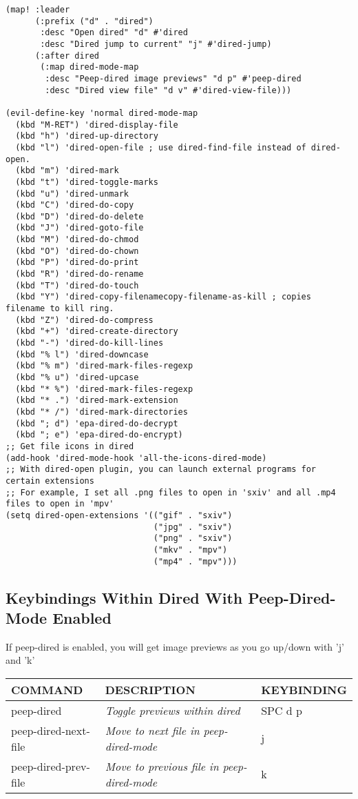 \documentclass[11pt]{article}
\begin{document}
\begin{verbatim}
(map! :leader
      (:prefix ("d" . "dired")
       :desc "Open dired" "d" #'dired
       :desc "Dired jump to current" "j" #'dired-jump)
      (:after dired
       (:map dired-mode-map
        :desc "Peep-dired image previews" "d p" #'peep-dired
        :desc "Dired view file" "d v" #'dired-view-file)))

(evil-define-key 'normal dired-mode-map
  (kbd "M-RET") 'dired-display-file
  (kbd "h") 'dired-up-directory
  (kbd "l") 'dired-open-file ; use dired-find-file instead of dired-open.
  (kbd "m") 'dired-mark
  (kbd "t") 'dired-toggle-marks
  (kbd "u") 'dired-unmark
  (kbd "C") 'dired-do-copy
  (kbd "D") 'dired-do-delete
  (kbd "J") 'dired-goto-file
  (kbd "M") 'dired-do-chmod
  (kbd "O") 'dired-do-chown
  (kbd "P") 'dired-do-print
  (kbd "R") 'dired-do-rename
  (kbd "T") 'dired-do-touch
  (kbd "Y") 'dired-copy-filenamecopy-filename-as-kill ; copies filename to kill ring.
  (kbd "Z") 'dired-do-compress
  (kbd "+") 'dired-create-directory
  (kbd "-") 'dired-do-kill-lines
  (kbd "% l") 'dired-downcase
  (kbd "% m") 'dired-mark-files-regexp
  (kbd "% u") 'dired-upcase
  (kbd "* %") 'dired-mark-files-regexp
  (kbd "* .") 'dired-mark-extension
  (kbd "* /") 'dired-mark-directories
  (kbd "; d") 'epa-dired-do-decrypt
  (kbd "; e") 'epa-dired-do-encrypt)
;; Get file icons in dired
(add-hook 'dired-mode-hook 'all-the-icons-dired-mode)
;; With dired-open plugin, you can launch external programs for certain extensions
;; For example, I set all .png files to open in 'sxiv' and all .mp4 files to open in 'mpv'
(setq dired-open-extensions '(("gif" . "sxiv")
                              ("jpg" . "sxiv")
                              ("png" . "sxiv")
                              ("mkv" . "mpv")
                              ("mp4" . "mpv")))
\end{verbatim}

\subsection{Keybindings Within Dired With Peep-Dired-Mode Enabled}
\label{sec:orgab5ec2d}
If peep-dired is enabled, you will get image previews as you go up/down with 'j' and 'k'

\begin{center}
\begin{tabular}{lll}
COMMAND & DESCRIPTION & KEYBINDING\\[0pt]
\hline
peep-dired & \emph{Toggle previews within dired} & SPC d p\\[0pt]
peep-dired-next-file & \emph{Move to next file in peep-dired-mode} & j\\[0pt]
peep-dired-prev-file & \emph{Move to previous file in peep-dired-mode} & k\\[0pt]
\end{tabular}
\end{center}
\end{document}

